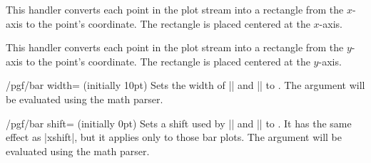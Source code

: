 \begin{command}{\pgfplothandlerybar}
  This handler converts each point in the plot stream into a rectangle from
  the $x$-axis to the point's coordinate. The rectangle is placed centered at the $x$-axis.
  
\begin{codeexample}[]
\end{codeexample}
\end{command}

\begin{command}{\pgfplothandlerxbar}
  This handler converts each point in the plot stream into a rectangle from
  the $y$-axis to the point's coordinate. The rectangle is placed centered at the $y$-axis.
  
\begin{codeexample}[]
\end{codeexample}
\end{command}

\label{key-bar-width}%
\begin{key}{/pgf/bar width= (initially 10pt)}
	Sets the width of |\pgfplothandlerxbar| and |\pgfplothandlerybar| to . The argument  will be evaluated using the math parser.
\end{key}

\label{key-bar-shift}%
\begin{key}{/pgf/bar shift= (initially 0pt)}
	Sets a shift used by |\pgfplothandlerxbar| and |\pgfplothandlerybar| to . It has the same effect as |xshift|, but it applies only to those bar plots. The argument  will be evaluated using the math parser.
\end{key}

